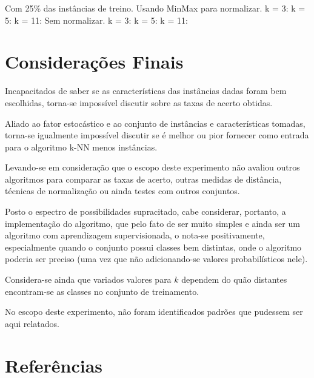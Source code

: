 \documentclass[12pt]{article}
\begin{document}
		Com 25\% das instâncias de treino.
			Usando MinMax para normalizar.
				k = 3:
				k = 5:
				k = 11:
			Sem normalizar.
				k = 3:
				k = 5:
				k = 11:
	\section{Considerações Finais}\label{sec:consideracoesFinais}

		Incapacitados de saber se as características das instâncias dadas foram bem escolhidas, torna-se impossível discutir sobre as taxas de acerto obtidas.
		
		Aliado ao fator estocástico e ao conjunto de instâncias e características tomadas, torna-se igualmente impossível discutir se é melhor ou pior fornecer como entrada para o algoritmo k-NN menos instâncias.

		Levando-se em consideração que o escopo deste experimento não avaliou outros algoritmos para comparar as taxas de acerto, outras medidas de distância, técnicas de normalização ou ainda testes com outros conjuntos.

		Posto o espectro de possibilidades supracitado, cabe considerar, portanto, a implementação do algoritmo, que pelo fato de ser muito simples e ainda ser um algoritmo com aprendizagem supervisionada, o nota-se positivamente, especialmente quando o conjunto possui classes bem distintas, onde o algoritmo poderia ser preciso (uma vez que não adicionando-se valores probabilísticos nele).

		Considera-se ainda que variados valores para $k$ dependem do quão distantes encontram-se as classes no conjunto de treinamento.

		No escopo deste experimento, não foram identificados padrões que pudessem ser aqui relatados.

	\section{Referências}\label{sec:referencias}

		
\end{document}
